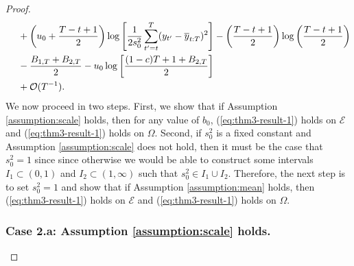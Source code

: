 \begin{proof}
\begin{align}
    &\quad\: + \left(u_0 + \frac{T - t +1}{2}\right)\log\left[ \frac{1}{2s_0^2}\sum_{t'=t}^T (y_{t'} - \overline{y}_{t:T})^2 \right] - \left(\frac{T - t + 1}{2}\right) \log\left(\frac{T-t+1}{2}\right)\notag\\
    &\quad\: - \frac{B_{1,T} + B_{2,T}}{2}  - u_0\log\left[\frac{(1-c)T + 1 + B_{2,T}}{2}\right] \notag \\
    &\quad\: +  \mathcal{O}(T^{-1}). \label{eq:thm3-cs2-bd4}
\end{align}
We now proceed in two steps. First, we show that if Assumption \ref{assumption:scale} holds, then for any value of $b_0$, (\ref{eq:thm3-result-1}) holds on $\mathcal{E}$ and (\ref{eq:thm3-result-1}) holds on $\Omega$. Second, if $s_0^2$ is a fixed constant and Assumption \ref{assumption:scale} does not hold, then it must be the case that $s_0^2 = 1$ since since otherwise we would be able to construct some intervals $I_1\subset(0,1)$ and $I_2 \subset(1,\infty)$ such that $s_0^2 \in I_1\cup I_2$. Therefore, the next step is to set $s_0^2 = 1$ and show that if Assumption \ref{assumption:mean} holds, then (\ref{eq:thm3-result-1}) holds on $\mathcal{E}$ and (\ref{eq:thm3-result-1}) holds on $\Omega$.

\subsubsection*{Case 2.a: Assumption \ref{assumption:scale} holds.}


\end{proof}
